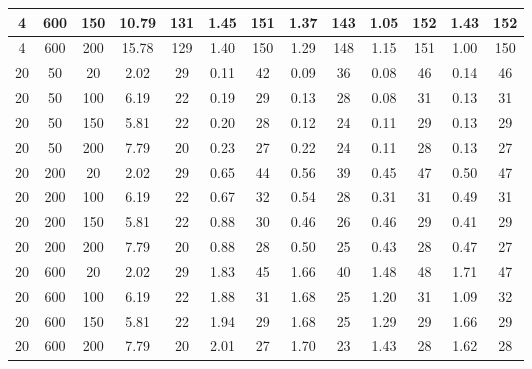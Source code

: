 \documentclass{article}
\begin{document}
\begin{center}
\begin{tabular}{| c c c | c c | c c | c c | c c | c c |}
            \hline
            4          & 600     & 150 & 10.79  & 131        & 1.45   & 151        & 1.37   & 143        & 1.05   & 152        & 1.43   & 152        \\
            \hline
            4          & 600     & 200 & 15.78  & 129        & 1.40   & 150        & 1.29   & 148        & 1.15   & 151        & 1.00   & 150        \\
            \hline
            20         & 50      & 20  & 2.02   & 29         & 0.11   & 42         & 0.09   & 36         & 0.08   & 46         & 0.14   & 46         \\
            \hline
            20         & 50      & 100 & 6.19   & 22         & 0.19   & 29         & 0.13   & 28         & 0.08   & 31         & 0.13   & 31         \\
            \hline
            20         & 50      & 150 & 5.81   & 22         & 0.20   & 28         & 0.12   & 24         & 0.11   & 29         & 0.13   & 29         \\
            \hline
            20         & 50      & 200 & 7.79   & 20         & 0.23   & 27         & 0.22   & 24         & 0.11   & 28         & 0.13   & 27         \\
            \hline
            20         & 200     & 20  & 2.02   & 29         & 0.65   & 44         & 0.56   & 39         & 0.45   & 47         & 0.50   & 47         \\
            \hline
            20         & 200     & 100 & 6.19   & 22         & 0.67   & 32         & 0.54   & 28         & 0.31   & 31         & 0.49   & 31         \\
            \hline
            20         & 200     & 150 & 5.81   & 22         & 0.88   & 30         & 0.46   & 26         & 0.46   & 29         & 0.41   & 29         \\
            \hline
            20         & 200     & 200 & 7.79   & 20         & 0.88   & 28         & 0.50   & 25         & 0.43   & 28         & 0.47   & 27         \\
            \hline
            20         & 600     & 20  & 2.02   & 29         & 1.83   & 45         & 1.66   & 40         & 1.48   & 48         & 1.71   & 47         \\
            \hline
            20         & 600     & 100 & 6.19   & 22         & 1.88   & 31         & 1.68   & 25         & 1.20   & 31         & 1.09   & 32         \\
            \hline
            20         & 600     & 150 & 5.81   & 22         & 1.94   & 29         & 1.68   & 25         & 1.29   & 29         & 1.66   & 29         \\
            \hline
            20         & 600     & 200 & 7.79   & 20         & 2.01   & 27         & 1.70   & 23         & 1.43   & 28         & 1.62   & 28         \\
            \hline
        \end{tabular}
    \end{center}
\end{document}

